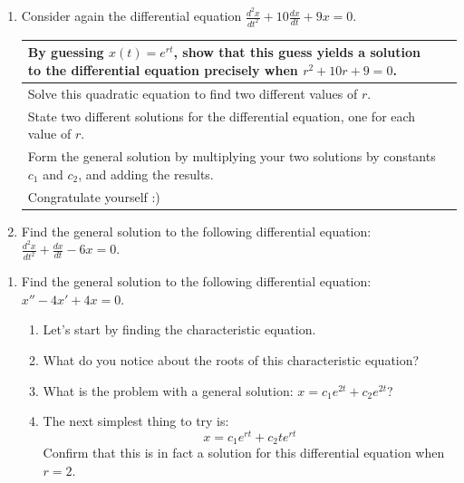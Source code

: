 \begin{enumerate}
\clearpage

\item Consider again the differential equation $\displaystyle\frac{d^2x}{dt^2}+10\frac{dx}{dt}+9x=0$. \label{13problem6}

\begin{tabular}{|p{2.5in}|p{3in}|}
\hline
By guessing $x(t) = e^{rt}$, show that this guess yields a solution to the differential equation precisely when $r^2 + 10r + 9 = 0$. \vspace{2.25in} &  \\ \hline
Solve this quadratic equation to find two different values of $r$. \vspace{1.25in} &  \\ \hline
State two different solutions for the differential equation, one for each value of $r$. &  \\ \hline
Form the general solution by multiplying your two solutions by constants $c_1$ and $c_2$, and adding the results. &  \\ \hline
Congratulate yourself :) &  \\ \hline
\end{tabular}

\item Find the general solution to the following differential equation: $\displaystyle\frac{d^2x}{dt^2}+\frac{dx}{dt}-6x=0$. \label{13problem7}
\end{enumerate}
\clearpage
{}

\begin{enumerate}[resume]
\item Find the general solution to the following differential equation: $x''-4x'+4x=0$. 
\begin{enumerate}
\item Let's start by finding the characteristic equation.
\vspace{1in}
\item What do you notice about the roots of this characteristic equation?
\vspace{1in}
\item What is the problem with a general solution: $x=c_1e^{2t}+c_2e^{2t}$?
\vspace{1in}
\item The next simplest thing to try is:
\[
x=c_1e^{rt}+c_2te^{rt}
\]
Confirm that this is in fact a solution for this differential equation when $r=2$.
\vfill
\end{enumerate}
\end{enumerate}

